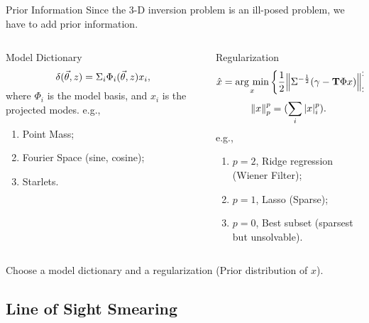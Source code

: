 \begin{frame}{Prior Information}
Since the $3$-D inversion problem is an \alert{ill-posed problem}, we have to add \alert{prior information}.
\begin{columns}[t]
\begin{column}{0.5\textwidth}
\begin{alertblock}{Model Dictionary}
\begin{equation} \notag
\delta(\vec{\theta},z)=\Sigma_{i} \Phi_i(\vec{\theta},z) x_i,
\end{equation}
where $\Phi_i$ is the model basis, and $x_i$ is the projected modes.
e.g.,
\begin{enumerate}
    \item Point Mass;
    \item Fourier Space (sine, cosine);
    \item Starlets.
\end{enumerate}
\end{alertblock}
\end{column}

\begin{column}{0.5\textwidth}
\begin{alertblock}{Regularization}
\begin{equation} \notag
\hat{x}=\mathop{\rm arg~min}\limits_{x} \left\{ \frac{1}{2}\norm{\Sigma^{-\frac{1}{2}}(\gamma-
\mathbf{T} \Phi x)}_2^2+ \lambda \norm{x}_p^p \right\},
\end{equation}
\begin{equation}\notag
\norm{x}_p^p=(\sum_{i} |x|^p_i).
\end{equation}
e.g.,
\begin{enumerate}
    \item $p=2$, \alert{Ridge regression} (Wiener Filter);
    \item $p=1$, \alert{Lasso} (Sparse);
    \item $p=0$, \alert{Best subset} (sparsest but unsolvable).
\end{enumerate}
\end{alertblock}
\end{column}
\end{columns}
Choose a \alert{model dictionary} and a \alert{regularization
(Prior distribution of $x$)}.
\end{frame}


\subsection{Line of Sight Smearing}

